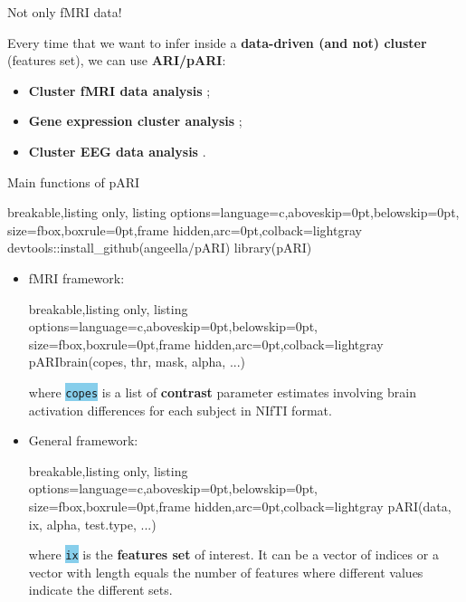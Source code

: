\documentclass{beamer}
\begin{document}
\begin{frame}{Not only fMRI data!}

Every time that we want to infer inside a \textcolor{bluenight}{\textbf{data-driven (and not) cluster}} (features set), we can use \textcolor{bluenight}{\textbf{ARI/pARI}}:
\vspace{.5cm}
\begin{itemize}
	\item \textcolor{bluenight}{\textbf{Cluster fMRI data analysis}} \footnotemark {};
	\vspace{.5cm}
	\item \textcolor{bluenight}{\textbf{Gene expression cluster analysis}} \footnotemark {};
	\vspace{.5cm}
	\item \textcolor{bluenight}{\textbf{Cluster EEG data analysis}} \footnotemark {}.
\end{itemize}

\end{frame}



\begin{frame}[fragile]{Main functions of pARI}

\begin{tcblisting}{breakable,listing only,
		listing options={language=c,aboveskip=0pt,belowskip=0pt},
		size=fbox,boxrule=0pt,frame hidden,arc=0pt,colback=lightgray}
devtools::install_github(angeella/pARI)
library(pARI)
\end{tcblisting}

\begin{itemize}
	\item fMRI framework: \begin{tcblisting}{breakable,listing only,
			listing options={language=c,aboveskip=0pt,belowskip=0pt},
			size=fbox,boxrule=0pt,frame hidden,arc=0pt,colback=lightgray}
	pARIbrain(copes, thr, mask, alpha, ...)
	\end{tcblisting}
where \colorbox{skyblue}{\texttt{copes}} is a list of \textcolor{bluenight}{\textbf{contrast}} parameter estimates involving brain activation differences for each subject in NIfTI format.
	\item General framework: \begin{tcblisting}{breakable,listing only,
			listing options={language=c,aboveskip=0pt,belowskip=0pt},
			size=fbox,boxrule=0pt,frame hidden,arc=0pt,colback=lightgray}
	pARI(data, ix, alpha, test.type, ...)
	\end{tcblisting}
where \colorbox{skyblue}{\texttt{ix}} is the \textcolor{bluenight}{\textbf{features set}} of interest. It can be a vector of indices or a vector with length equals the number of features where different values indicate the different sets.
\end{itemize}



\end{frame}
\end{document}
